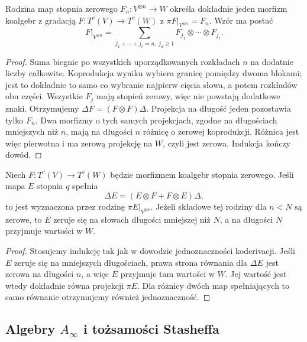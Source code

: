 \begin{twierdzenie}\label{cat:thm:ainfty-coalgebra-map}
Rodzina map stopnia zerowego $F_n:V^{\otimes n}\to W$ określa dokładnie jeden morfizm koalgebr z gradacją $F:T^c(V)\to T^c(W)$ z $\pi F|_{V^{\otimes n}}=F_n$. Wzór ma postać
\begin{equation}\label{cat:eq:ainfty-coalgebra-extension}
 F|_{V^{\otimes n}}=
 \sum_{j_1+\cdots+j_\ell=n,\ j_a\geq1}
 F_{j_1}\otimes\cdots\otimes F_{j_\ell}.
\end{equation}
\end{twierdzenie}
\begin{proof}
Suma biegnie po wszystkich uporządkowanych rozkładach $n$ na dodatnie liczby całkowite. Koprodukcja wyniku wybiera granicę pomiędzy dwoma blokami; jest to dokładnie to samo co wybranie najpierw cięcia słowa, a potem rozkładów obu części. Wszystkie $F_j$ mają stopień zerowy, więc nie powstają dodatkowe znaki. Otrzymujemy $\Delta F=(F\otimes F)\Delta$. Projekcja na długość jeden pozostawia tylko $F_n$. Dwa morfizmy o tych samych projekcjach, zgodne na długościach mniejszych niż $n$, mają na długości $n$ różnicę o zerowej koprodukcji. Różnica jest więc pierwotna i ma zerową projekcję na $W$, czyli jest zerowa. Indukcja kończy dowód.
\end{proof}

\begin{lemat}\label{cat:lem:ainfty-relative-coderivation}
Niech $F:T^c(V)\to T^c(W)$ będzie morfizmem koalgebr stopnia zerowego. Jeśli mapa $E$ stopnia $q$ spełnia
\[
 \Delta E=(E\otimes F+F\otimes E)\Delta,
\]
to jest wyznaczona przez rodzinę $\pi E|_{V^{\otimes n}}$. Jeżeli składowe tej rodziny dla $n<N$ są zerowe, to $E$ zeruje się na słowach długości mniejszej niż $N$, a na długości $N$ przyjmuje wartości w $W$.
\end{lemat}
\begin{proof}
Stosujemy indukcję tak jak w dowodzie jednoznaczności koderivacji. Jeśli $E$ zeruje się na mniejszych długościach, prawa strona równania dla $\Delta E$ jest zerowa na długości $n$, a więc $E$ przyjmuje tam wartości w $W$. Jej wartość jest wtedy dokładnie równa projekcji $\pi E$. Dla różnicy dwóch map spełniających to samo równanie otrzymujemy również jednoznaczność.
\end{proof}

\subsection{\texorpdfstring{Algebry $A_\infty$}{Algebry A-infty} i tożsamości Stasheffa}

